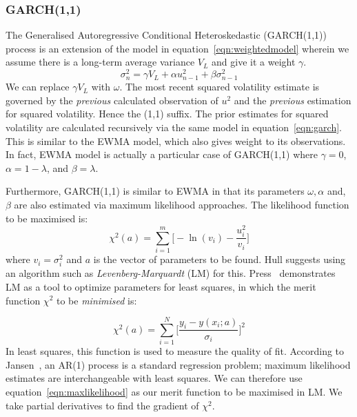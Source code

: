 \documentclass[../background_research.tex]{subfiles}
\begin{document}
\subsubsection{GARCH(1,1)}
The Generalised Autoregressive Conditional Heteroskedastic (GARCH(1,1)) process is an extension of the model in equation~\ref{eqn:weightedmodel} wherein we assume there is a long-term average variance $V_L$ and give it a weight $\gamma$.
\begin{equation}
	\label{eqn:garch}
	\sigma^2_n=\gamma{V_L}+\alpha{u^2_{n-1}}+\beta\sigma^2_{n-1}
\end{equation}
We can replace $\gamma{V_L}$ with $\omega$.
The most recent squared volatility estimate is governed by the \textit{previous} calculated observation of $u^2$ and the \textit{previous} estimation for squared volatility.
Hence the (1,1) suffix.
The prior estimates for squared volatility are calculated recursively via the same model in equation~\ref{eqn:garch}.
This is similar to the EWMA model, which also gives weight to its observations.
In fact, EWMA model is actually a particular case of GARCH(1,1) where $\gamma=0$, $\alpha = 1-\lambda$, and $\beta = \lambda$.

Furthermore, GARCH(1,1) is similar to EWMA in that its parameters $\omega, \alpha$ and, $\beta$ are also estimated via maximum likelihood approaches.
The likelihood function to be maximised is:
\begin{equation}
	\label{eqn:maxlikelihood}
	\chi^2(a)=\sum_{i=1}^m\Bigg[-\ln({v_i}) - \frac{u^2_i}{v_i}\Bigg]
\end{equation}
where $v_i = \sigma^2_i$ and $a$ is the vector of parameters to be found.
Hull suggests using an algorithm such as \textit{Levenberg-Marquardt} (LM) for this.
Press~\cite{Press:1992} demonstrates LM as a tool to optimize parameters for least squares, in which the merit function $\chi^2$ to be \textit{minimised} is:

\begin{equation}
	\label{eqn:LSmerit}
	\chi^2(a) = \sum_{i=1}^N\Bigg[\frac{y_i-y(x_i;a)}{\sigma_i}\Bigg]^2
\end{equation}
In least squares, this function is used to measure the quality of fit.
According to Jansen~\cite{Jansen:2014}, an AR(1) process is a standard regression problem; maximum likelihood estimates are interchangeable with least squares.
We can therefore use equation~\ref{eqn:maxlikelihood} as our merit function to be maximised in LM.
We take partial derivatives to find the gradient of $\chi^2$.
\end{document}
